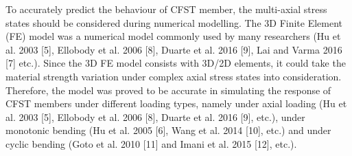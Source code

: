 \documentclass[12pt, A4]{article}
\begin{document}
	To accurately predict the behaviour of CFST member, the multi-axial stress states should be considered during numerical modelling. The 3D Finite Element (FE) model was a numerical model commonly used by many researchers (Hu et al. 2003 [5], Ellobody et al. 2006 [8], Duarte et al. 2016 [9], Lai and Varma 2016 [7] etc.). Since the 3D FE model consists with 3D/2D elements, it could take the material strength variation under complex axial stress states into consideration. Therefore, the model was proved to be accurate in simulating the response of CFST members under different loading types, namely under axial loading (Hu et al. 2003 [5], Ellobody et al. 2006 [8], Duarte et al. 2016 [9], etc.), under monotonic bending (Hu et al. 2005 [6], Wang et al. 2014 [10], etc.) and under cyclic bending (Goto et al. 2010 [11] and Imani et al. 2015 [12], etc.). 
	
\end{document}
